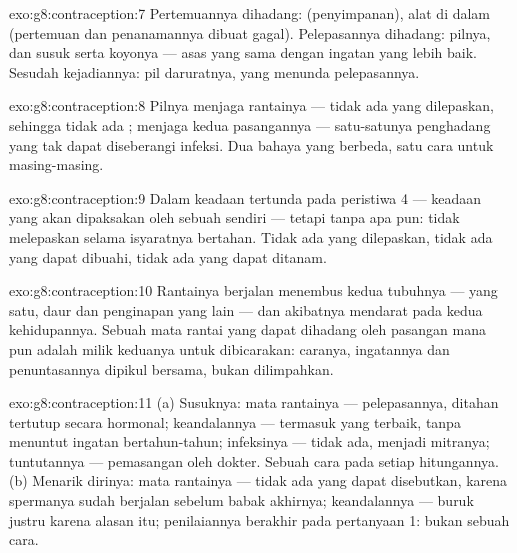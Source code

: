\begin{solution}{exo:g8:contraception:7}
Pertemuannya dihadang:  (penyimpanan), alat di
dalam  (pertemuan dan penanamannya dibuat gagal).
Pelepasannya dihadang: pilnya, dan susuk serta koyonya ---
asas yang sama dengan ingatan yang lebih baik. Sesudah
kejadiannya: pil daruratnya, yang menunda pelepasannya.
\end{solution}

\begin{solution}{exo:g8:contraception:8}
Pilnya menjaga rantainya --- tidak ada  yang
dilepaskan, sehingga tidak ada ;  menjaga
kedua pasangannya --- satu-satunya penghadang yang tak dapat
diseberangi infeksi. Dua bahaya yang berbeda, satu cara
untuk masing-masing.
\end{solution}

\begin{solution}{exo:g8:contraception:9}
Dalam keadaan tertunda pada peristiwa 4 --- keadaan yang
akan dipaksakan oleh  sebuah  sendiri ---
tetapi tanpa  apa pun:  tidak
melepaskan  selama isyaratnya bertahan. Tidak ada
yang dilepaskan, tidak ada yang dapat dibuahi, tidak ada
yang dapat ditanam.
\end{solution}

\begin{solution}{exo:g8:contraception:10}
Rantainya berjalan menembus kedua tubuhnya ---  yang
satu, daur dan penginapan yang lain --- dan akibatnya
mendarat pada kedua kehidupannya. Sebuah mata rantai yang
dapat dihadang oleh pasangan mana pun adalah milik keduanya
untuk dibicarakan: caranya, ingatannya dan penuntasannya
dipikul bersama, bukan dilimpahkan.
\end{solution}

\begin{solution}{exo:g8:contraception:11}
(a) Susuknya: mata rantainya --- pelepasannya, ditahan
tertutup secara hormonal; keandalannya --- termasuk yang
terbaik, tanpa menuntut ingatan bertahun-tahun; infeksinya
--- tidak ada,  menjadi mitranya; tuntutannya ---
pemasangan oleh dokter. Sebuah cara pada setiap
hitungannya. (b) Menarik dirinya: mata rantainya --- tidak
ada yang dapat disebutkan, karena spermanya sudah berjalan
sebelum babak akhirnya; keandalannya --- buruk justru karena
alasan itu; penilaiannya berakhir pada pertanyaan 1: bukan
sebuah cara.
\end{solution}

